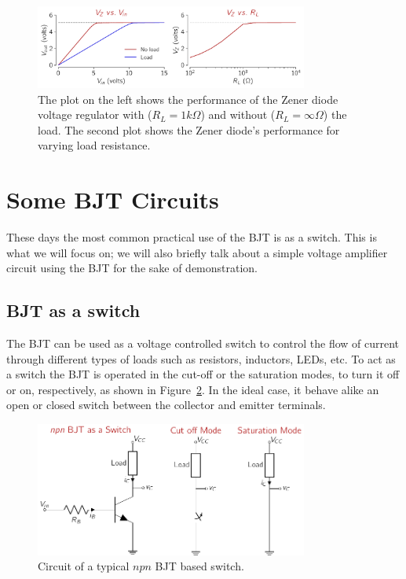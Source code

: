 \begin{figure}[htbp]
    \centering
    \includegraphics[width=0.8\textwidth]{figures/ch03/fig03-diode-zener-voltreg-plot.pdf}
    \caption{The plot on the left shows the performance of the Zener diode voltage regulator with ($R_L = 1k\Omega$) and without ($R_L = \infty \Omega$) the load. The second plot shows the Zener diode's performance for varying load resistance.}
    \label{fig:03-diode-zener-voltreg-plot}
\end{figure}

\section{Some BJT Circuits}
These days the most common practical use of the BJT is as a switch. This is what we will focus on; we will also briefly talk about a simple voltage amplifier circuit using the BJT for the sake of demonstration.

\subsection{BJT as a switch}
The BJT can be used as a voltage controlled switch to control the flow of current through different types of loads such as resistors, inductors, LEDs, etc. To act as a switch the BJT is operated in the cut-off or the saturation modes, to turn it off or on, respectively, as shown in Figure~\ref{fig:03-bjt-switch-ckt}. In the ideal case, it behave alike an open or closed switch between the collector and emitter terminals. 
\begin{figure}[htbp]
    \centering
    \includegraphics[width=0.8\textwidth]{figures/ch03/fig03-bjt-switch.pdf}
    \caption{Circuit of a typical $npn$ BJT based switch.}
    \label{fig:03-bjt-switch-ckt}
\end{figure}

